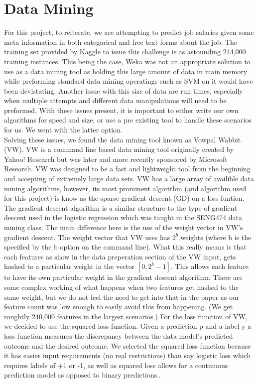 \section{Data Mining}
\label{sec:dm}

For this project, to reiterate, we are attempting to predict job salaries given some meta information in both categorical and free text forms
about the job. The training set provided by Kaggle to issue this challenge is as astounding 244,000 training instances. This being the case,
Weka was not an appropriate solution to use as a data mining tool as holding this large amount of data in main memory while preforming standard
data mining operatings such as SVM on it would have been devistating. Another issue with this size of data are run times, especially when 
multiple attempts and different data manipulations will need to be preformed. With these issues present, it is important to either write
our own algorithms for speed and size, or use a pre existing tool to handle these scenarios for us. We went with the latter option.\\

Solving these issues, we found the data mining tool known as Vowpal Wabbit (VW). VW is a command line based data mining tool originally
created by Yahoo! Research but was later and more recently sponsored by Microsoft Research. VW was designed to be a fast and lightweight
tool from the beginning and accepting of extremely large data sets. VW has a large array of availible data mining algorithms, however,
its most prominent algorithm (and algorithm used for this project) is know as the sparse gradient descent (GD) on a loss funtion.\\

The gradient descent algorithm is a similar structure to the type of gradient descent used in the logistic regression which was taught
in the SENG474 data mining class. The main difference here is the use of the weight vector in VW's gradient descent. The weight vector
that VW uses has $2^b$ weights (where b is the specified by the b option on the command line). What this really means is that each features
as show in the data preperation section of the VW input, gets hashed to a particular weight in the vector $[0, 2^b-1]$. This allows each
feature to have its own particular weight in the gradient descent algorithm. There are some complex working of what happens when two
features get hashed to the same weight, but we do not feel the need to get into that in the paper as our feature count was low enough
to easily avoid this from happening. (We get roughtly 240,000 features in the largest scenarios.) For the loss function of VW, we decided
to use the squared loss function. Given a prediction p and a label y a loss function measures the discrepancy between the data model's
predicted outcome and the desired outcome. We selected the squared loss function because it has easier input requirements (no real
restrictions) than say logistic loss which requires labels of +1 or -1, as well as squared loss allows for a continuous prediction model
as opposed to binary predictions..\\

